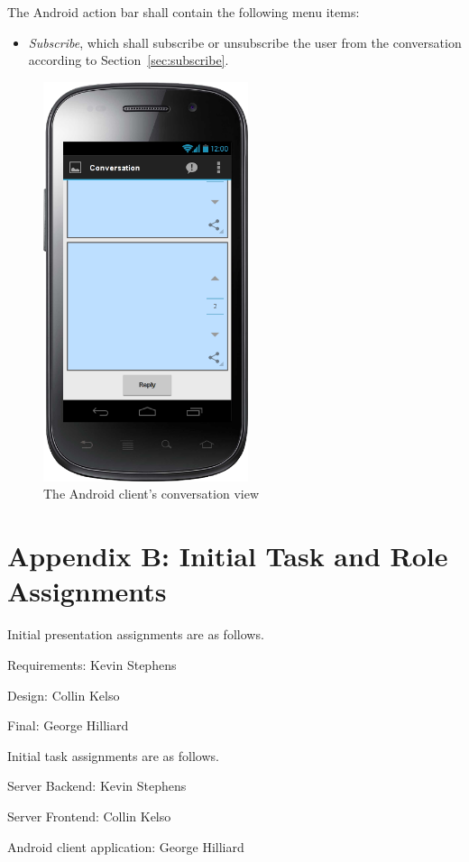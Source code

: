 \documentclass[11pt]{scrartcl}
\let\stdsection\section
\renewcommand\section{\newpage\stdsection}
\begin{document}
        The Android action bar shall contain the following menu items:

        \begin{itemize}
            \item \emph{Subscribe}, which shall subscribe or unsubscribe the user from the conversation according to Section~\ref{sec:subscribe}.
        \end{itemize}

        \begin{figure}[h]
            \centering \includegraphics[width=6cm,keepaspectratio]{mockups/conversation-view}
            \caption{The Android client's conversation view}
            \label{fig:conversationscreen}
        \end{figure}

\section*{Appendix B: Initial Task and Role Assignments}
    Initial presentation assignments are as follows.
    \begin{description*}
        \item[Requirements:] Kevin Stephens
        \item[Design:] Collin Kelso
        \item[Final:] George Hilliard
    \end{description*}

    Initial task assignments are as follows.
    \begin{description*}
        \item[Server Backend:] Kevin Stephens
        \item[Server Frontend:] Collin Kelso
        \item[Android client application:] George Hilliard
    \end{description*}
\end{document}
